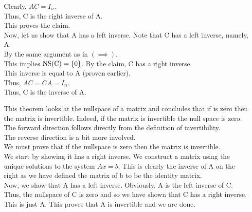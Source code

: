 \documentclass[12pt]{article}
\begin{document}
\begin{prf}{}
Clearly, \(AC = I_n\).\\
Thus, C is the right inverse of A.\\
This proves the claim.\\
Now, let us show that A has a left inverse. Note that C has a left inverse, namely, A.\\
By the same argument as in \(\left(\implies\right)\).\\
This implies \(\rm{NS}(C) = \{0\}\). By the claim, C has a right inverse.\\
This inverse is equal to A (proven earlier).\\
Thus, \(AC = CA = I_n\).\\
Thus, C is the inverse of A.
\end{prf}
\begin{explanation}{}
    This theorem looks at the nullspace of a matrix and concludes that if is zero then the matrix is invertible. Indeed, if the matrix is invertible the null space is zero.\\
The forward direction follows directly from the definition of invertibility.\\
The reverse direction is a bit more involved.\\
We must prove that if the nullspace is zero then the matrix is invertible.\\
We start by showing it has a right inverse. We construct a matrix using the unique solutions to the system $Ax = b$. This is clearly the inverse of A on the right as we have defined the matrix of b to be the identity matrix.\\
Now, we show that A has a left inverse. Obviously, A is the left inverse of C. Thus, the nullspace of C is zero and so we have shown that C has a right inverse. This is just A. This proves that A is invertible and we are done.\\
\end{explanation}
\end{document}
